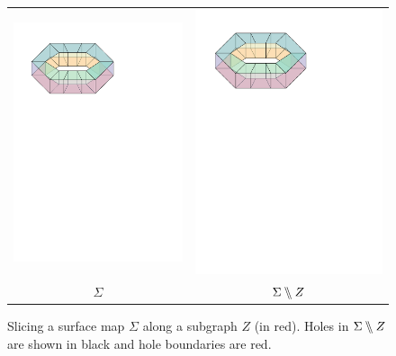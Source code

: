 \begin{figure}
    \begin{center}
        \begin{tabular}{cc}
            \includegraphics[width=.45\textwidth,page=2]{figs/slicing-orig} &
            \includegraphics[width=.45\textwidth,page=4]{figs/slicing-orig} \\
            $\Sigma$ & $\Sigma\bbslash Z$
        \end{tabular}
    \end{center}
    \caption{Slicing a surface map $\Sigma$ along a subgraph $Z$ (in red). Holes in $\Sigma\bbslash Z$ are shown in black and hole boundaries are red.}
    \label{slicing}
\end{figure}

